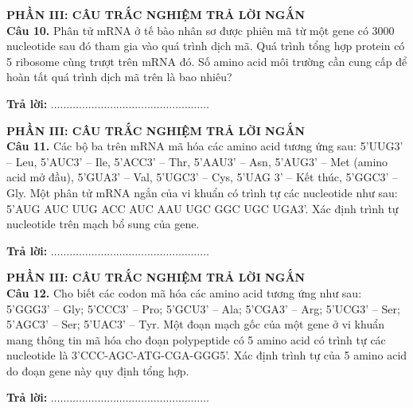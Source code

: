 \documentclass{article}
\begin{document}
\begin{minipage}[t][14.4cm][t]{\linewidth}
\fontsize{25}{34}\selectfont
{\color{brandGreen}\textbf{PHẦN III: CÂU TRẮC NGHIỆM TRẢ LỜI NGẮN}\\[10pt]}
\textbf{Câu 10.} Phân tử mRNA ở tế bào nhân sơ được phiên mã từ một gene có 3000 nucleotide sau đó tham gia vào quá trình dịch mã. Quá trình tổng hợp protein có 5 ribosome cùng trượt trên mRNA đó. Số amino acid môi trường cần cung cấp để hoàn tất quá trình dịch mã trên là bao nhiêu?
\vspace{20pt}

\textbf{Trả lời:} $\dots\dots\dots\dots\dots\dots\dots\dots\dots\dots\dots\dots\dots\dots\dots\dots\dots$
\vfill
\end{minipage}
\newpage


\begin{minipage}[t][14.4cm][t]{\linewidth}
\fontsize{22}{30}\selectfont
{\color{brandGreen}\textbf{PHẦN III: CÂU TRẮC NGHIỆM TRẢ LỜI NGẮN}\\[10pt]}
\textbf{Câu 11.} Các bộ ba trên mRNA mã hóa các amino acid tương ứng sau: 5'UUG3' – Leu, 5'AUC3' – Ile, 5'ACC3' – Thr, 5'AAU3' – Asn, 5'AUG3' – Met (amino acid mở đầu), 5'GUA3' – Val, 5'UGC3' – Cys, 5'UAG 3' – Kết thúc, 5'GGC3' – Gly. Một phân tử mRNA ngắn của vi khuẩn có trình tự các nucleotide như sau: 5'AUG AUC UUG ACC AUC AAU UGC GGC UGC UGA3'. Xác định trình tự nucleotide trên mạch bổ sung của gene.
\vspace{20pt}

\textbf{Trả lời:} $\dots\dots\dots\dots\dots\dots\dots\dots\dots\dots\dots\dots\dots\dots\dots\dots\dots$
\vfill
\end{minipage}
\newpage


\begin{minipage}[t][14.4cm][t]{\linewidth}
\fontsize{22}{30}\selectfont
{\color{brandGreen}\textbf{PHẦN III: CÂU TRẮC NGHIỆM TRẢ LỜI NGẮN}\\[10pt]}
\textbf{Câu 12.} Cho biết các codon mã hóa các amino acid tương ứng như sau: 5'GGG3' – Gly; 5'CCC3' – Pro; 5'GCU3' – Ala; 5'CGA3' – Arg; 5'UCG3' – Ser; 5'AGC3' – Ser; 5'UAC3' – Tyr. Một đoạn mạch gốc của một gene ở vi khuẩn mang thông tin mã hóa cho đoạn polypeptide có 5 amino acid có trình tự các nucleotide là 3'CCC-AGC-ATG-CGA-GGG5'. Xác định trình tự của 5 amino acid do đoạn gene này quy định tổng hợp.
\vspace{20pt}

\textbf{Trả lời:} $\dots\dots\dots\dots\dots\dots\dots\dots\dots\dots\dots\dots\dots\dots\dots\dots\dots$
\vfill
\end{minipage}
\newpage
\end{document}

